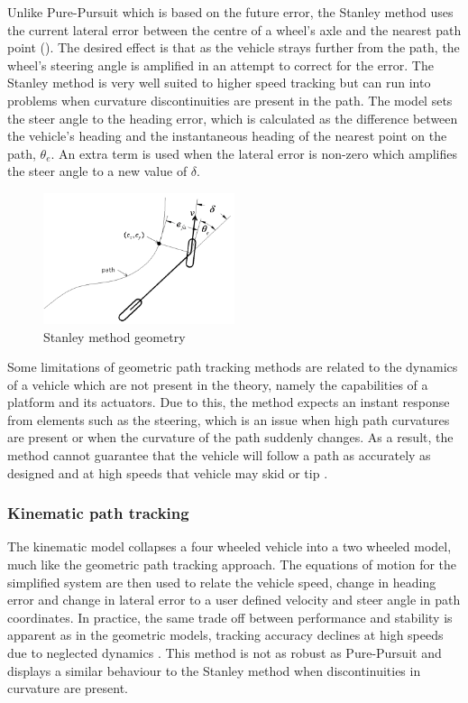 \documentclass[main.tex]{subfiles}
\begin{document}
Unlike Pure-Pursuit which is based on the future error, the Stanley method uses the current lateral error between the centre of a wheel's axle and the nearest path point (). The desired effect is that as the vehicle strays further from the path, the wheel's steering angle is amplified in an attempt to correct for the error. The Stanley method is very well suited to higher speed tracking but can run into problems when curvature discontinuities are present in the path. The model sets the steer angle to the heading error, which is calculated as the difference between the vehicle's heading and the instantaneous heading of the nearest point on the path, $\theta_e$. An extra term is used when the lateral error is non-zero which amplifies the steer angle to a new value of $\delta$.
\begin{figure}[ht]
\includegraphics[width=0.5\textwidth]{2-LiteratureReview/stanleyMethod.png}
\centering
\caption[Stanley method geometry]{Stanley method geometry \parencite{snider2009}} 
\end{figure}

%
%

Some limitations of geometric path tracking methods are related to the dynamics of a vehicle which are not present in the theory, namely the capabilities of a platform and its actuators. Due to this, the method expects an instant response from elements such as the steering, which is an issue when high path curvatures are present or when the curvature of the path suddenly changes. As a result, the method cannot guarantee that the vehicle will follow a path as accurately as designed and at high speeds that vehicle may skid or tip \parencite{coulter1992}.

\subsubsection{Kinematic path tracking}
The kinematic model collapses a four wheeled vehicle into a two wheeled model, much like the geometric path tracking approach. The equations of motion for the simplified system are then used to relate the vehicle speed, change in heading error and change in lateral error to a user defined velocity and steer angle in path coordinates. In practice, the same trade off between performance and stability is apparent as in the geometric models, tracking accuracy declines at high speeds due to neglected dynamics \parencite{snider2009}. This method is not as robust as Pure-Pursuit and displays a similar behaviour to the Stanley method when discontinuities in curvature are present.
\end{document}
